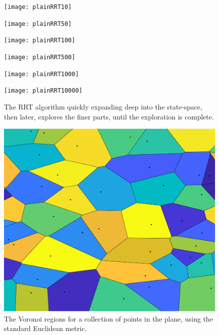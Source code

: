 \begin{figure}
  \centering
  \begin{minipage}[c]{0.3\textwidth}
    \texttt{[image: plainRRT10]}
  \end{minipage}
  \begin{minipage}[c]{0.3\textwidth}
    \texttt{[image: plainRRT50]}
  \end{minipage}
  \begin{minipage}[c]{0.3\textwidth}
    \texttt{[image: plainRRT100]}
  \end{minipage}
  \newline %
  \begin{minipage}[c]{0.3\textwidth}
    \texttt{[image: plainRRT500]}
  \end{minipage}
  \begin{minipage}[c]{0.3\textwidth}
    \texttt{[image: plainRRT1000]}
  \end{minipage}
  \begin{minipage}[c]{0.3\textwidth}
    \texttt{[image: plainRRT10000]}
  \end{minipage}
  \caption[The rapid expansion of the \ac{RRT} motion planning algorithm]{The
    \ac{RRT} algorithm quickly expanding deep into the state-space, then later,
    explores the finer parts, until the exploration is complete.}
  \label{fig:rrt-expansion}
\end{figure}


\begin{figure}
  \centering \includegraphics[scale=.3]{figures/rrt/voronoi-diagram}
  \caption[The Voronoi regions for a collection of points in the plane]{The Voronoi regions for a collection of points in the
    plane, using the standard Euclidean metric.}
  \label{fig:voronoi-diagram}
\end{figure}

